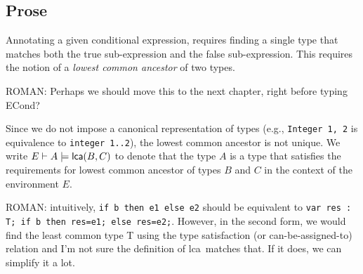 \documentclass{book}
\newcommand\lca[0]{\textsf{lca}}
\newcommand\lcasat[0]{\models}
\begin{document}
\subsection{Prose}
  Annotating a given conditional expression, requires finding a single type that matches both the true sub-expression and the false sub-expression. This requires the notion of a \emph{lowest common ancestor} of two types. 
\begin{emptytodo}  
ROMAN: Perhaps we should move this to the next chapter, right before typing ECond?
\end{emptytodo}
  Since we do not impose a canonical representation of types (e.g., \texttt{Integer {1, 2}} is equivalence to \texttt{integer {1..2}}), the lowest common ancestor is not unique. We write $E \entails A \lcasat \lca(B, C)$ to denote that the type $A$ is a type that satisfies the requirements for lowest common ancestor of types $B$ and $C$ in the context of the environment $E$.

\begin{emptytodo}
ROMAN: intuitively, \texttt{if b then e1 else e2} should be equivalent to \texttt{var res : T; if b then res=e1; else res=e2;}. However, in the second form, we would find the least common type T using the type satisfaction (or can-be-assigned-to) relation and I'm not sure the definition of \lca\ matches that. If it does, we can simplify it a lot.
\end{emptytodo}
\end{document}
